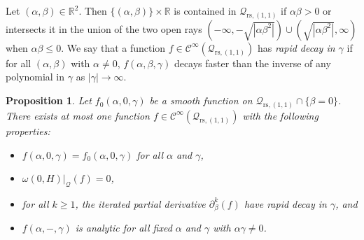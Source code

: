 \documentclass[reqno, 11pt]{amsart} %
\numberwithin{equation}{section}
\theoremstyle{plain}
\newtheorem{proposition}[theorem]{Proposition}
\theoremstyle{definition}
\theoremstyle{remark}
\newcommand{\mr}{\mathrm}
\newcommand{\mbR}{\mathbb{R}}
\newcommand{\mcC}{\mathcal{C}}
\newcommand{\mcQ}{\mathcal{Q}}
\newcommand{\rs}{\mr{rs}}
\begin{document}
Let $(α, β)\in \mbR^2$. Then $\{(α,β)\}\times \mbR$ is contained in $\mcQ_{\rs, (1,1)}$ if $αβ > 0$ or intersects it in the union of the two open rays $(-\infty, -\sqrt{|αβ^2|})\cup (\sqrt{|αβ^2|}, \infty)$ when $αβ \leq 0$. We say that a function $f\in \mcC^\infty(\mcQ_{\rs, (1,1)})$ has \emph{rapid decay in $γ$} if for all $(α,β)$ with $α\neq 0$, $f(α, β, γ)$ decays faster than the inverse of any polynomial in $γ$ as $|γ|\to \infty$.

\begin{proposition}\label{prop:unique_extension}
Let $f_0(α, 0, γ)$ be a smooth function on $\mcQ_{\rs,(1,1)}\cap \{β = 0\}$. There exists at most one function $f \in \mcC^\infty(\mcQ_{\rs,(1,1)})$ with the following properties:
\begin{itemize}
\item[(a)] $f(α,0,γ) = f_0(α, 0, γ)$ for all $α$ and $γ$,
\item[(b)] $ω(0,H)\vert_{\mcQ}(f) = 0$,
\item[(c)] for all $k\geq 1$, the iterated partial derivative $\partial_β^k(f)$ have rapid decay in $γ$, and
\item[(d)] $f(α, -, γ)$ is analytic for all fixed $α$ and $γ$ with $αγ\neq 0$.
\end{itemize}
\end{proposition}
\end{document}

